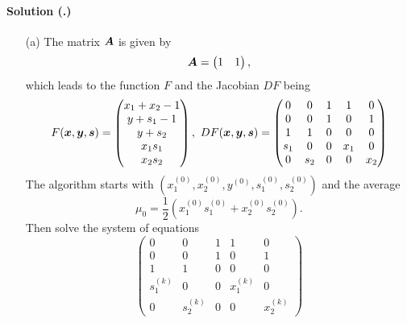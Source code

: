 \documentclass{article}
\newcounter{problemSheetNumber}
\newcounter{problems}
\renewcommand{\solution}[1]{\paragraph{Solution (\theproblemSheetNumber.\theproblems)}\addtocounter{problems}{1}\label{#1}}
\begin{document}
\solution{pr:2} \begin{itemize} \item[(a)] The matrix $\bm{A}$ is given by
\begin{equation*}
 \bm{A} = \begin{pmatrix} 1 & 1 \end{pmatrix},
\end{equation*}
which leads to the function $F$ and the Jacobian $DF$ being
\begin{equation*}
 F(\vct{x},\vct{y},\vct{s}) = \begin{pmatrix}
                               x_1+x_2-1\\
                               y +s_1-1\\
                               y+s_2\\
                               x_1s_1\\
                               x_2s_2
                              \end{pmatrix}, \ 
 DF(\vct{x},\vct{y},\vct{s}) = \begin{pmatrix} 
                               0 & 0 & 1 & 1 & 0\\
                               0 & 0 & 1 & 0 & 1\\
                               1 & 1 & 0 & 0 & 0\\
                               s_1 & 0 & 0 & x_1 & 0\\
                               0 & s_2 & 0 & 0 & x_2
                              \end{pmatrix}
\end{equation*}
The algorithm starts with $(x_1^{(0)},x_2^{(0)},y^{(0)},s_1^{(0)},s_2^{(0)})$ and the average
\begin{equation*}
 \mu_0 = \frac{1}{2}(x_1^{(0)}s_1^{(0)}+x_2^{(0)}s_2^{(0)}).
\end{equation*}
Then solve the system of equations
\begin{equation*}
 \begin{pmatrix} 
                               0 & 0 & 1 & 1 & 0\\
                               0 & 0 & 1 & 0 & 1\\
                               1 & 1 & 0 & 0 & 0\\
                               s^{(k)}_1 & 0 & 0 & x^{(k)}_1 & 0\\
                               0 & s^{(k)}_2 & 0 & 0 & x^{(k)}_2
                              \end{pmatrix} 

\end{equation*}
\end{itemize}
\end{document}
